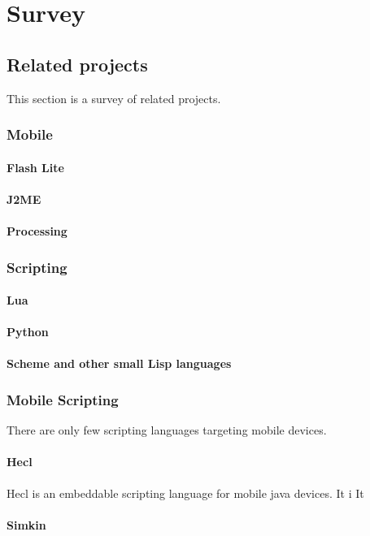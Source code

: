 \chapter{Survey}

\section{Related projects}
This section is a survey of related projects.
\subsection{Mobile}
\subsubsection{Flash Lite}
\subsubsection{J2ME}
\subsubsection{Processing}
\subsection{Scripting}
\subsubsection{Lua}
\subsubsection{Python}
\subsubsection{Scheme and other small Lisp languages}

\subsection{Mobile Scripting}
There are only few scripting languages targeting mobile devices. 

\subsubsection{Hecl}
Hecl\cite{hecl} is an embeddable scripting language for mobile java devices.
It i
It 
\subsubsection{Simkin}
